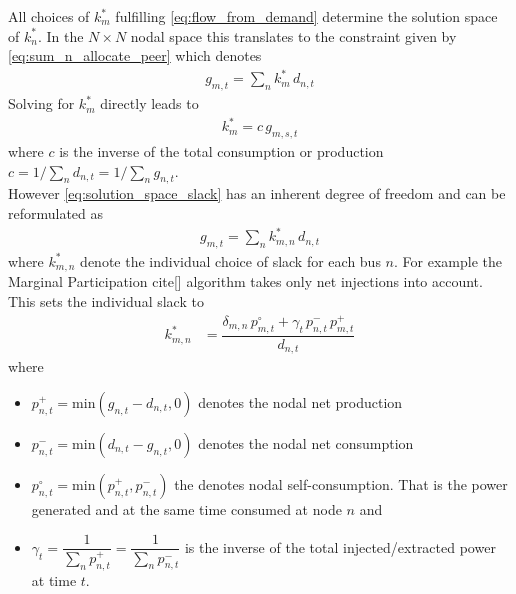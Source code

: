 \documentclass[11pt,twocolumn]{article}
\newcommand{\generation}[1][n]{g_{#1,s,t}}
\newcommand{\nodalgeneration}[1][n]{g_{#1,t}}
\newcommand{\nodaldemand}[1][n]{d_{#1,t}}
\newcommand{\slackk}[1][n]{k^*_{#1}}
\newcommand{\Slackk}{k^*_{m,n}}
\newcommand{\injection}{p_{n,t}}
\newcommand{\netconsumption}[1][n]{p^{-}_{#1,t}}
\newcommand{\netproduction}[1][n]{p^{+}_{#1,t}}
\newcommand{\selfconsumption}[1][n]{p^{\circ}_{#1,t}}
\begin{document}
All choices of $\slackk[m]$ fulfilling \cref{eq:flow_from_demand} determine the solution space of $\slackk$. In the $N \times N$ nodal space this translates to the constraint given by \cref{eq:sum_n_allocate_peer} which denotes
\begin{align}
 \nodalgeneration[m] = \sum_n \slackk[m] \, \nodaldemand  
 \label{eq:solution_space_slack}
\end{align}
Solving for $\slackk[m]$ directly leads to 
\begin{align}
 \slackk[m] = c \, \generation[m] 
\end{align}
where $c$ is the inverse of the total consumption or production $c = 1 / \sum_n \nodaldemand   = 1 / \sum_n \nodalgeneration$. \\
However \cref{eq:solution_space_slack} has an inherent degree of freedom and can be reformulated as 
\begin{align}
 \nodalgeneration[m] = \sum_n \Slackk \, \nodaldemand  
 \label{eq:solution_space_slack_extended}
\end{align}
where $\Slackk$ denote the individual choice of slack for each bus $n$. For example the Marginal Participation cite[] algorithm takes only net injections into account. This sets the individual slack to 
\begin{align}
\Slackk &= \dfrac{ \delta_{m,n}\,\selfconsumption[m] + \gamma_t \, \netconsumption  \, \netproduction[m]}{\nodaldemand}
\end{align}
where 
\begin{itemize}
 \item $\netproduction = \text{min}\left( \nodalgeneration - \nodaldemand , 0 \right) $ denotes the nodal net production 
 \item $\netconsumption = \text{min}\left( \nodaldemand  - \nodalgeneration, 0 \right)$ denotes the nodal net consumption
 \item $\selfconsumption = \text{min}\left( \netproduction, \netconsumption \right)$ the denotes  nodal self-consumption. That is the power generated and at the same time consumed at node $n$ and 
 \item $\gamma_t = \dfrac{1}{\sum_n \netproduction} = \dfrac{1}{\sum_n \netconsumption}$ is the inverse of the total injected/extracted power at time $t$.
\end{itemize}
\end{document}
